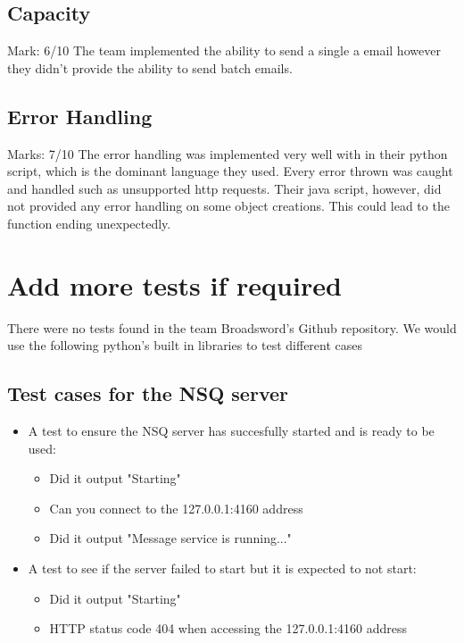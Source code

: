 \documentclass[11pt]{article}
\begin{document}
	\subsection{Capacity}
		Mark: 6/10\newline
		The team implemented the ability to send a single a email however they didn't provide the ability to send batch emails.
		
	\subsection{Error Handling}
	    	 Marks: 7/10\newline
The error handling was implemented very well with in their python script, which is the dominant language they used. Every error thrown was caught and handled such as unsupported http requests. Their java script, however, did not provided any error handling on some object creations. This could lead to the function ending unexpectedly.


\section{Add more tests if required}
	There were no tests found in the team Broadsword's Github repository. We would use the following python's built in libraries to test different cases
	\subsection{Test cases for the NSQ server}	
		\begin{itemize}
			\item A test to ensure the NSQ server has succesfully started and is ready to be used:
				\begin{itemize}
					\item Did it output "Starting"
					\item Can you connect to the 127.0.0.1:4160 address
					\item Did it output "Message service is running..."
				\end{itemize}
			\item A test to see if the server failed to start but it is expected to not start:
				\begin{itemize}
					\item Did it output "Starting"
					\item HTTP status code 404 when accessing the 127.0.0.1:4160 address
				\end{itemize}
			\end{itemize}
\end{document}
